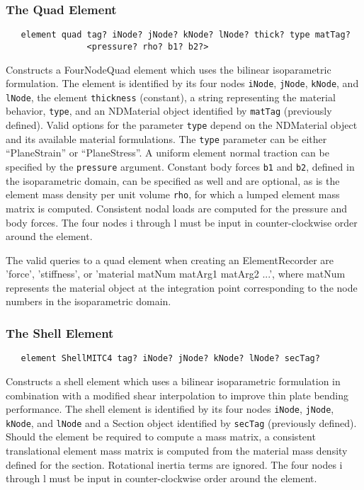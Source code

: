 \documentclass[12pt]{article}
\begin{document}
\subsubsection{The Quad Element}
{\sf\small
\begin{verbatim}
   element quad tag? iNode? jNode? kNode? lNode? thick? type matTag? 
                <pressure? rho? b1? b2?>
\end{verbatim}
}

\noindent Constructs a FourNodeQuad element which uses the bilinear
isoparametric formulation. The element is identified by its four nodes
{\tt iNode}, {\tt jNode}, {\tt kNode}, and {\tt lNode}, the element
{\tt thickness} (constant), a string representing the material behavior,
{\tt type}, and an NDMaterial object identified by {\tt matTag} (previously
defined). Valid options for the parameter {\tt type} depend on the
NDMaterial object and its available material formulations. The {\tt type}
parameter can be either ``PlaneStrain'' or ``PlaneStress''. A uniform element
normal traction can be specified by the {\tt pressure} argument. Constant
body forces {\tt b1} and {\tt b2}, defined in the isoparametric domain, can be
specified as well and are optional, as is the element mass density per
unit volume {\tt rho}, for which a lumped element mass matrix is
computed. Consistent nodal loads are computed for the pressure and
body forces. The four nodes i through l must be input in
counter-clockwise order around the element.

The valid queries to a quad element when creating an ElementRecorder
are 'force', 'stiffness', or 'material matNum matArg1 matArg2 ...',  where
matNum represents the material object at the integration point
corresponding to the node numbers in the isoparametric domain.


\subsubsection{The Shell Element}
{\sf\small
\begin{verbatim}
   element ShellMITC4 tag? iNode? jNode? kNode? lNode? secTag? 
\end{verbatim}
}

\noindent 
Constructs a shell element which uses a bilinear
isoparametric formulation in combination with a modified shear
interpolation to improve thin plate bending performance. 
The shell element is identified by its four nodes
{\tt iNode}, {\tt jNode}, {\tt kNode}, and {\tt lNode} 
and a Section object identified by {\tt secTag} (previously defined). 
Should the element be required to compute a mass matrix, a consistent 
translational element mass matrix is computed from the material mass
density defined for the section.  Rotational inertia terms 
are ignored. The four nodes i through l must be input in
counter-clockwise order around the element.
\end{document}
